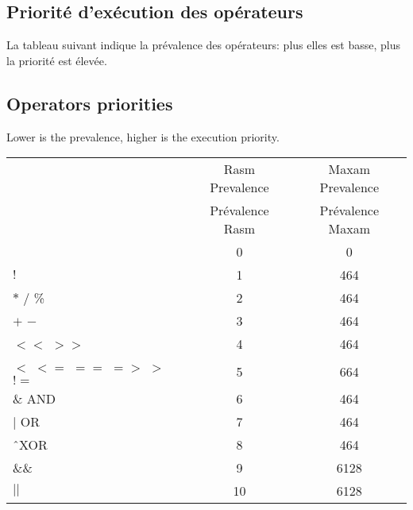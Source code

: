 \begin{xfr}
\subsection{Priorité d’exécution des opérateurs}
La tableau suivant indique la prévalence des opérateurs: plus elles est basse, plus la priorité est élevée.
\end{xfr}

\begin{xen}
\subsection{Operators priorities}
Lower is the prevalence, higher is the execution priority.
\end{xen}

\begin{tabular}{lcc}
\begin{xen}
Operators &	Rasm Prevalence	& Maxam Prevalence \\

\end{xen}
\begin{xfr}
Opérateur &	Prévalence Rasm	& Prévalence Maxam \\
\hline
\end{xfr}
$($ $)$	 & 0	& 0 \\
$!$ & 1	& 464 \\
$*$ $/$  \%	& 2	& 464 \\
$+$ $-$	& 3	& 464 \\
$<<$ $>>$	& 4	 & 464 \\
$<$ $<=$ $==$ $=>$ $>$ $!=$	& 5	& 664 \\
\& AND & 6	& 464 \\
$|$ OR & 7	& 464 \\
\^\  XOR & 8	& 464 \\
\&\& & 9 & 6128 \\
$||$ & 10	& 6128 \\
\end{tabular}
